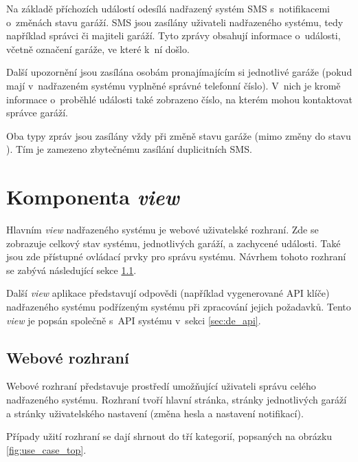 
Na základě příchozích událostí odesílá nadřazený systém SMS s~notifikacemi o~změnách stavu garáží. SMS jsou zasílány uživateli nadřazeného systému, tedy například správci či majiteli garáží. Tyto zprávy obsahují informace o~události, včetně označení garáže, ve které k~ní došlo. 

Další upozornění jsou zasílána osobám pronajímajícím si jednotlivé garáže (pokud mají v~nadřazeném systému vyplněné správné telefonní číslo). V~nich je kromě informace o~proběhlé události také zobrazeno číslo, na kterém mohou kontaktovat správce garáží.

Oba typy zpráv jsou zasílány vždy při změně stavu garáže (mimo změny do stavu ). Tím je zamezeno zbytečnému zasílání duplicitních SMS.

\section{Komponenta \textit{view}}
\label{sec:de_view}

Hlavním \textit{view} nadřazeného systému je webové uživatelské rozhraní. Zde se zobrazuje celkový stav systému, jednotlivých garáží, a zachycené události. Také jsou zde přístupné ovládací prvky pro správu systému. Návrhem tohoto rozhraní se zabývá následující sekce \ref{sec:de_web}.

Další \textit{view} aplikace představují odpovědi (například vygenerované API klíče) nadřazeného systému podřízeným systému při zpracování jejich požadavků. Tento \textit{view} je popsán společně s~API systému v~sekci \ref{sec:de_api}.

\subsection{Webové rozhraní}
\label{sec:de_web}

Webové rozhraní představuje prostředí umožňující uživateli správu celého nadřazeného systému. Rozhraní tvoří hlavní stránka, stránky jednotlivých garáží a stránky uživatelského nastavení (změna hesla a nastavení notifikací).

Případy užití rozhraní se dají shrnout do tří kategorií, popsaných na obrázku \ref{fig:use_case_top}.

